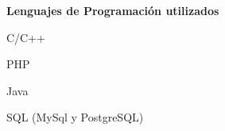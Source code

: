 \documentclass[a4paper,12pt,final]{memoir}
\newcommand{\Sep}{\vspace{1.5em}}
\newcommand{\SmallSep}{\vspace{0.5em}}
\newcommand{\CVSection}[1]
	{\Large\textbf{#1}\par
	\SmallSep\normalsize\normalfont}
\newcommand{\CVItem}[1]
	{\textbf{\color{RoyalBlue} #1}}
\begin{document}
\CVItem{Lenguajes de Programación utilizados}
\begin{multicols}{2}
\begin{compactitem}[\color{RoyalBlue}$\circ$]
	\item C/C++ 
	\item PHP 
	\item Java
	\item SQL (MySql y PostgreSQL) 
\end{compactitem}
\end{multicols}
\Sep 


\end{document}
